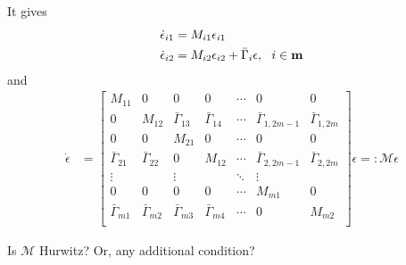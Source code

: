 \documentclass{beamer}
\begin{document}
\begin{frame}{\color{blue} }

It gives
\begin{align*}
\dot{\epsilon}_{i1}&=M_{i1}\epsilon_{i1} \\
\dot{\epsilon}_{i2}&=M_{i2}\epsilon_{i2} + \bar{\Gamma}_{i}\epsilon,~~ i\in{\bf m}
\end{align*}
and
\begin{align*}
\dot{\epsilon}&=\left[\begin{array}{ll|ll|c|ll}
                  M_{11} & 0 &  0 & 0  & \cdots &  0  & 0 \\
                  0 & M_{12}  & \bar{\Gamma}_{13}  & \bar{\Gamma}_{14}  & \cdots &  \bar{\Gamma}_{1,2m-1}  & \bar{\Gamma}_{1,2m} \\ \hline
                  0 & 0 & M_{21} & 0 & \cdots &  0  & 0 \\
                  \bar{\Gamma}_{21}  & \bar{\Gamma}_{22}  & 0 & M_{12} & \cdots & \bar{\Gamma}_{2,2m-1}  & \bar{\Gamma}_{2,2m} \\ \hline
                  \vdots &   &  \vdots  &    & \ddots &  \vdots   & \\ \hline
                  0 & 0 &  0 & 0  & \cdots &  M_{m1}  & 0 \\
                  \bar{\Gamma}_{m1} & \bar{\Gamma}_{m2}  & \bar{\Gamma}_{m3}  & \bar{\Gamma}_{m4}  & \cdots & 0 & M_{m2} \\
                \end{array}\right]\epsilon=:\mathcal{M}\epsilon
\end{align*}

Is $\mathcal{M}$ Hurwitz? Or, any additional condition?
\end{frame}
\end{document}

